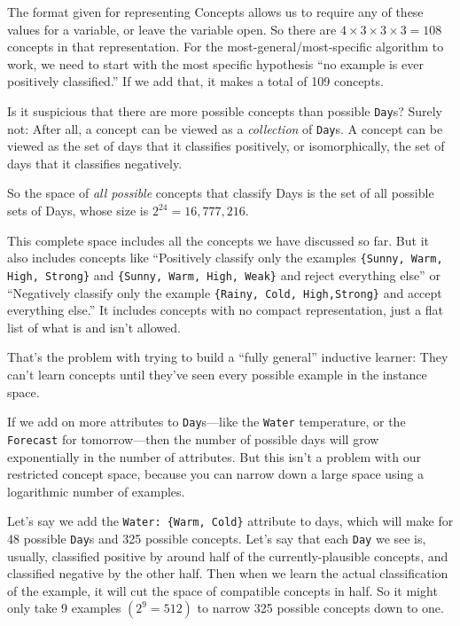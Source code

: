 {{{
 The format given for representing Concepts allows us to require
any of these values for a variable, or leave the variable open. So
there are $4 \times 3 \times 3 \times 3 = 108$ concepts
in that representation. For the most-general/most-specific algorithm to
work, we need to start with the most specific hypothesis
``no example is ever positively
classified.'' If we add that, it makes a total of 109
concepts.}

{
 Is it suspicious that there are more possible concepts than
possible \texttt{Day}s? Surely not: After all, a concept can be viewed as a
\textit{collection} of \texttt{Day}s. A concept can be viewed as the set of days
that it classifies positively, or isomorphically, the set of days that
it classifies negatively.}

{
 So the space of \textit{all possible} concepts that classify Days
is the set of all possible sets of Days, whose size is
$2^{24} = 16,777,216$.}

{
 This complete space includes all the concepts we have discussed so
far. But it also includes concepts like ``Positively
classify only the examples \texttt{\{Sunny, Warm, High, Strong\}} and
\texttt{\{Sunny, Warm, High, Weak\}} and reject everything
else'' or ``Negatively classify only
the example \texttt{\{Rainy, Cold, High,Strong\}} and accept everything
else.'' It includes concepts with no compact
representation, just a flat list of what is and isn't
allowed.}

{
 That's the problem with trying to build a
``fully general'' inductive learner:
They can't learn concepts until they've
seen every possible example in the instance space.}

{
 If we add on more attributes to \texttt{Day}s---like the \texttt{Water} temperature,
or the \texttt{Forecast} for tomorrow---then the number of possible days will
grow exponentially in the number of attributes. But this
isn't a problem with our restricted concept space,
because you can narrow down a large space using a logarithmic number of
examples.}

{
  Let's say we add the \texttt{Water: \{Warm, Cold\}}
  attribute to days, which will
make for 48 possible \texttt{Day}s and 325 possible concepts.
Let's say that each \texttt{Day} we see is, usually, classified
positive by around half of the currently-plausible concepts, and
classified negative by the other half. Then when we learn the actual
classification of the example, it will cut the space of compatible
concepts in half. So it might only take 9 examples
$(2^9 = 512)$ to narrow 325 possible concepts down to
one.}

}}
